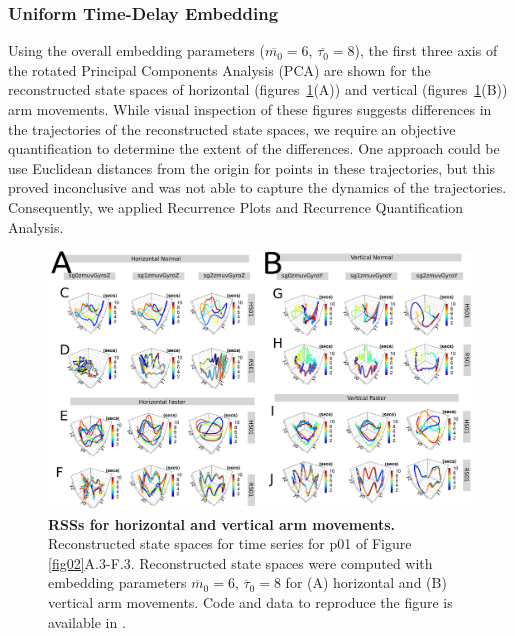 \documentclass[fleqn,10pt]{wlscirep}
\begin{document}
\subsubsection*{Uniform Time-Delay Embedding}
Using the overall embedding parameters ($\overline{m_0}=6$, $\overline{\tau_0}=8$), 
the first three axis of the rotated Principal Components Analysis (PCA) 
are shown for the reconstructed state spaces of horizontal (figures~\ref{fig:rsss}(A)) 
and vertical (figures~\ref{fig:rsss}(B)) arm movements. 
While visual inspection of these figures 
suggests differences in the trajectories of the reconstructed state spaces, 
we require an objective quantification to determine the extent of the differences.  
One approach could be use Euclidean distances from the origin for points in these 
trajectories, but this proved inconclusive and was not able to capture 
the dynamics of the trajectories. Consequently, we applied 
Recurrence Plots and Recurrence Quantification Analysis.
\begin{figure}[ht]
\centering
\includegraphics[width=1.0\textwidth]{figures/rss/versions/drawing-v00.pdf}
\caption{
	{\bf RSSs for horizontal and vertical arm movements.}
	Reconstructed state spaces for time series for p01 of Figure \ref{fig02}A.3-F.3.
	Reconstructed state spaces were computed with 
	embedding parameters 
	$\overline{m}_0=6$, $\overline{\tau}_0=8$
	for (A) horizontal and (B) vertical arm movements.
	Code and data to reproduce the figure is available in \cite{srep2021}.	
        }
    \label{fig:rsss}
\end{figure}
\end{document}
